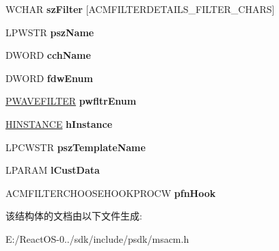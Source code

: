 \begin{DoxyCompactItemize}
\item 
\mbox{\label{struct___a_c_m_f_i_l_t_e_r_c_h_o_o_s_e_w_a6ea6299149b909bf80d2b3df72a8bd0a}} 
W\+C\+H\+AR {\bfseries sz\+Filter} \mbox{[}A\+C\+M\+F\+I\+L\+T\+E\+R\+D\+E\+T\+A\+I\+L\+S\+\_\+\+F\+I\+L\+T\+E\+R\+\_\+\+C\+H\+A\+RS\mbox{]}
\item 
\mbox{\label{struct___a_c_m_f_i_l_t_e_r_c_h_o_o_s_e_w_a3a0d1898bd61a7a17f00ac10c3b89a41}} 
L\+P\+W\+S\+TR {\bfseries psz\+Name}
\item 
\mbox{\label{struct___a_c_m_f_i_l_t_e_r_c_h_o_o_s_e_w_a92654a393d42f0fb984f338a44ca0324}} 
D\+W\+O\+RD {\bfseries cch\+Name}
\item 
\mbox{\label{struct___a_c_m_f_i_l_t_e_r_c_h_o_o_s_e_w_acb0957ccd2d80255f4b1c478dddbf964}} 
D\+W\+O\+RD {\bfseries fdw\+Enum}
\item 
\mbox{\label{struct___a_c_m_f_i_l_t_e_r_c_h_o_o_s_e_w_aee68f77463df9f1fa1a7813a74d2e086}} 
\hyperlink{struct___w_a_v_e_f_i_l_t_e_r}{P\+W\+A\+V\+E\+F\+I\+L\+T\+ER} {\bfseries pwfltr\+Enum}
\item 
\mbox{\label{struct___a_c_m_f_i_l_t_e_r_c_h_o_o_s_e_w_a0e5fbab0e7f52145ea07459bdc739b01}} 
\hyperlink{interfacevoid}{H\+I\+N\+S\+T\+A\+N\+CE} {\bfseries h\+Instance}
\item 
\mbox{\label{struct___a_c_m_f_i_l_t_e_r_c_h_o_o_s_e_w_a26d411cd53e432df827801e5281813ba}} 
L\+P\+C\+W\+S\+TR {\bfseries psz\+Template\+Name}
\item 
\mbox{\label{struct___a_c_m_f_i_l_t_e_r_c_h_o_o_s_e_w_ae3453197a847bfeff921dcf634af407c}} 
L\+P\+A\+R\+AM {\bfseries l\+Cust\+Data}
\item 
\mbox{\label{struct___a_c_m_f_i_l_t_e_r_c_h_o_o_s_e_w_ad613701d0e3698b1f88ebc05c3bee08b}} 
A\+C\+M\+F\+I\+L\+T\+E\+R\+C\+H\+O\+O\+S\+E\+H\+O\+O\+K\+P\+R\+O\+CW {\bfseries pfn\+Hook}
\end{DoxyCompactItemize}


该结构体的文档由以下文件生成\+:\begin{DoxyCompactItemize}
\item 
E\+:/\+React\+O\+S-\/0../sdk/include/psdk/msacm.\+h\end{DoxyCompactItemize}
